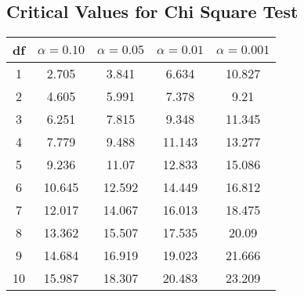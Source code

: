 \documentclass[a4paper,12pt]{article}
\begin{document}
\subsection*{Critical Values for Chi Square Test}
{
	\large
	\begin{center}
		\begin{tabular}{|c|c|c|c|c|}
			\hline 
			df	&	$\alpha=0.10$	&	$\alpha=0.05$	&	$\alpha=0.01$	&	$\alpha=0.001$	\\ \hline
			1	& 	2.705	&	3.841	&	6.634	&	10.827	\\ \hline
			2	&	4.605	&	5.991	&	7.378	&	9.21	\\ \hline
			3	&	6.251	&	7.815	&	9.348	&	11.345	\\ \hline
			4	&	7.779	&	9.488	&	11.143	&	13.277	\\ \hline
			5	&	9.236	&	11.07	&	12.833	&	15.086	\\ \hline
			6	&	10.645	&	12.592	&	14.449	&	16.812	\\ \hline
			7	&	12.017	&	14.067	&	16.013	&	18.475	\\ \hline
			8	&	13.362	&	15.507	&	17.535	&	20.09	\\ \hline
			9	&	14.684	&	16.919	&	19.023	&	21.666	\\ \hline
			10	&	15.987	&	18.307	&	20.483	&	23.209	\\ \hline
		\end{tabular} 
	\end{center}
}
\end{document}
